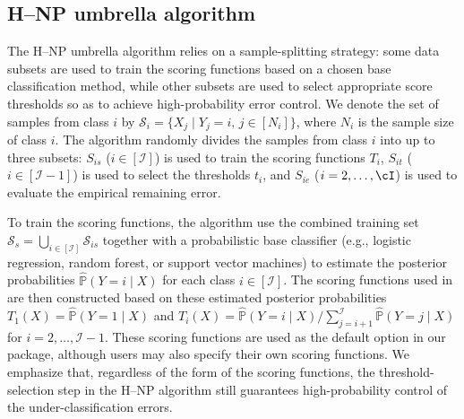 \subsection{H--NP umbrella algorithm}


The H--NP umbrella algorithm relies on a sample-splitting strategy: some data subsets are used to train the scoring functions based on a chosen base classification method, while other subsets are used to select appropriate score thresholds so as to achieve high-probability error control. We denote the set of samples from class $i$ by $\mathcal{S}_i=\{X_j \mid Y_j = i,\, j \in [N_i]\}$, where $N_i$ is the sample size of class $i$. The algorithm randomly divides the samples from class $i$ into up to three subsets: $S_{is}$ ($i \in [\mathcal{I}]$) is used to train the scoring functions $T_i$, $S_{it}$ ($i \in [\mathcal{I}-1]$) is used to select the thresholds $t_i$, and $S_{ie}$ ($i = 2, \ldots, \cI$)  is used to evaluate the empirical remaining error.

To train the scoring functions, the algorithm use the combined training set \(\mathcal{S}_s = \bigcup_{i \in [\mathcal{I}]} \mathcal{S}_{is}\) together with a probabilistic base classifier (e.g., logistic regression, random forest, or support vector machines) to estimate the posterior probabilities \(\widehat{\mathbb{P}}(Y = i \mid X)\) for each class \(i \in [\mathcal{I}]\). The   scoring functions used in \cite{wang2024hierarchical} are then constructed based on these estimated posterior probabilities $T_1(X) = \widehat{\mathbb{P}}(Y = 1 \mid X)$ and $T_i(X) = \widehat{\mathbb{P}}(Y = i \mid X) / \sum_{j = i+1}^{\mathcal{I}} \widehat{\mathbb{P}}(Y = j \mid X)$ for $i = 2, \ldots, \mathcal{I} - 1$. These scoring functions are used as the default option in our package, although users may also specify their own scoring functions. We emphasize that, regardless of the form of the scoring functions, the threshold-selection step in the H--NP algorithm still guarantees high-probability control of the under-classification errors.


